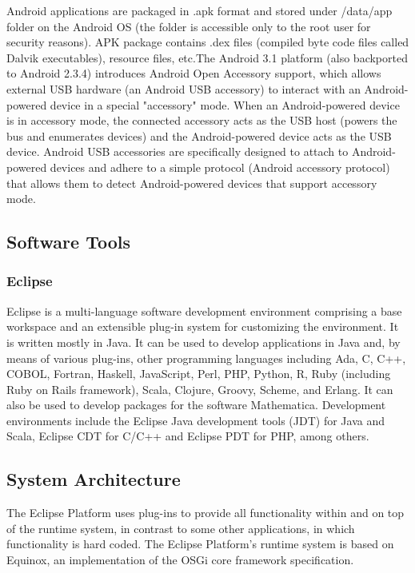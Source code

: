 Android applications are packaged in .apk format and stored under /data/app folder on the Android OS (the folder is accessible only to the root user for security reasons). APK package contains .dex files (compiled byte code files called Dalvik executables), resource files, etc.The Android 3.1 platform (also backported to Android 2.3.4) introduces Android Open Accessory support, which allows external USB hardware (an Android USB accessory) to interact with an Android-powered device in a special "accessory" mode. When an Android-powered device is in accessory mode, the connected accessory acts as the USB host (powers the bus and enumerates devices) and the Android-powered device acts as the USB device. Android USB accessories are specifically designed to attach to Android-powered devices and adhere to a simple protocol (Android accessory protocol) that allows them to detect Android-powered devices that support accessory mode.




\subsection{Software Tools}


\subsubsection{Eclipse}
Eclipse is a multi-language software development environment comprising a base workspace and an extensible plug-in system for customizing the environment. It is written mostly in Java. It can be used to develop applications in Java and, by means of various plug-ins, other programming languages including Ada, C, C++, COBOL, Fortran, Haskell, JavaScript, Perl, PHP, Python, R, Ruby (including Ruby on Rails framework), Scala, Clojure, Groovy, Scheme, and Erlang. It can also be used to develop packages for the software Mathematica. Development environments include the Eclipse Java development tools (JDT) for Java and Scala, Eclipse CDT for C/C++ and Eclipse PDT for PHP, among others.


\subsection{System Architecture}

The Eclipse Platform uses plug-ins to provide all functionality within and on top of the runtime system, in contrast to some other applications, in which functionality is hard coded. The Eclipse Platform's runtime system is based on Equinox, an implementation of the OSGi core framework specification.

